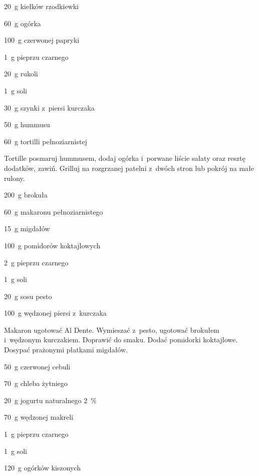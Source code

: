 \documentclass[../kucharek.tex]{subfiles}
\begin{document}
\begin{Ingred}
    \item \qty{20}{\gram} kiełków rzodkiewki
    \item \qty{60}{\gram} ogórka
    \item \qty{100}{\gram} czerwonej papryki
    \item \qty{1}{\gram} pieprzu czarnego
    \item \qty{20}{\gram} rukoli
    \item \qty{1}{\gram} soli
    \item \qty{30}{\gram} szynki z~piersi kurczaka
    \item \qty{50}{\gram} hummusu
    \item \qty{60}{\gram} tortilli pełnoziarnistej
\end{Ingred}

Tortille posmaruj hummusem, dodaj ogórka i~porwane liście sałaty oraz resztę
dodatków, zawiń. Grilluj na rozgrzanej patelni z~dwóch stron lub pokrój na małe
rulony.


\begin{Ingred}
    \item \qty{200}{\gram} brokuła
    \item \qty{60}{\gram} makaronu pełnoziarnistego
    \item \qty{15}{\gram} migdałów
    \item \qty{100}{\gram} pomidorów koktajlowych
    \item \qty{2}{\gram} pieprzu czarnego
    \item \qty{1}{\gram} soli
    \item \qty{20}{\gram} sosu pesto
    \item \qty{100}{\gram} wędzonej piersi z~kurczaka
\end{Ingred}

Makaron ugotować Al Dente. Wymieszać z~pesto, ugotować brokułem i~wędzonym
kurczakiem. Doprawić do smaku. Dodać pomidorki koktajlowe. Dosypać prażonymi
płatkami migdałów.


\begin{Ingred}
    \item \qty{50}{\gram} czerwonej cebuli
    \item \qty{70}{\gram} chleba żytniego
    \item \qty{20}{\gram} jogurtu naturalnego \qty{2}{\percent}
    \item \qty{70}{\gram} wędzonej makreli
    \item \qty{1}{\gram} pieprzu czarnego
    \item \qty{1}{\gram} soli
    \item \qty{120}{\gram} ogórków kiszonych
\end{Ingred}
\end{document}
